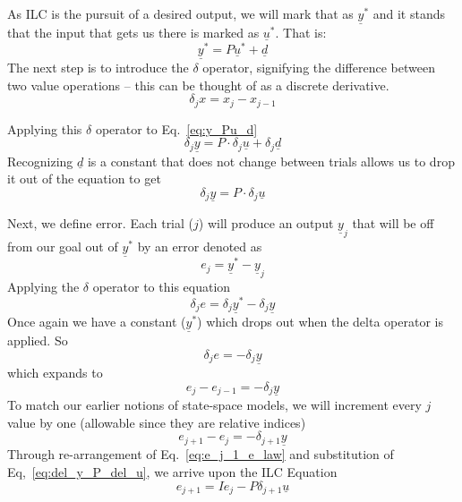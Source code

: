 As ILC is the pursuit of a desired output, we will mark that as ${\underline{y}}^ \ast $ and it stands that the input that gets us there is marked as ${\underline{u}}^ \ast $. That is:
\begin{equation}
    {\underline{y}}^\ast=P{\underline{u}}^\ast+\underline{d}
    \label{eq:y*_Pu*_d}
\end{equation}
The next step is to introduce the $\delta$ operator, signifying the difference between two value operations -- this can be thought of as a discrete derivative.
\begin{equation}
    \delta_j x=x_j-x_{j-1}
    \label{eq:delta_operator}
\end{equation}

Applying this $\delta$ operator to Eq.~\ref{eq:y_Pu_d}
\begin{equation}
    \delta_j\underline{y}=P\cdot\delta_j\underline{u}+\delta_j\underline{d}
    \label{eq:del_P_with_d}
\end{equation}
Recognizing $\underline{d}$ is a constant that does not change between trials allows us to drop it out of the equation to get
\begin{equation}
    \delta_j\underline{y}=P\cdot\delta_j\underline{u}
    \label{eq:del_y_P_del_u}
\end{equation}

Next, we define error. Each trial ($j$) will produce an output ${\underline{y}}_j$ that will be off from our goal out of ${\underline{y}}^\ast$ by an error denoted as
\begin{equation}
    e_j={\underline{y}}^\ast-{\underline{y}}_j
    \label{eq:e_j_def}
\end{equation}
Applying the $\delta$ operator to this equation
\begin{equation}
    \delta_j e=\delta_j{\underline{y}}^\ast-\delta_j\underline{y}
    \label{eq:del_e_law_w_star}
\end{equation}
Once again we have a constant (${\underline{y}}^\ast$) which drops out when the delta operator is applied. So 
\begin{equation}
    \delta_j e =-\delta_j \underline{y}
    \label{del_e_law}
\end{equation}
which expands to
\begin{equation}
    e_j-e_{j-1}=-\delta_j\underline{y}
    \label{e_j_e_j_1_law}
\end{equation}
To match our earlier notions of state-space models, we will increment every $j$ value by one (allowable since they are relative indices)
\begin{equation}
    e_{j+1}-e_j=-\delta_{j+1}\underline{y}
    \label{eq:e_j_1_e_law}
\end{equation}
Through re-arrangement of Eq.~\ref{eq:e_j_1_e_law} and substitution of Eq,~\ref{eq:del_y_P_del_u}, we arrive upon the ILC Equation
\begin{equation}
    e_{j+1}=Ie_j-P\delta_{j+1}\underline{u}
    \label{eq:ILC_law}
\end{equation}

